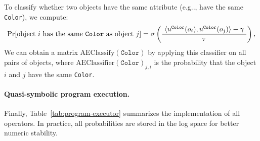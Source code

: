 \documentclass{article} \usepackage{iclr2019_conference,times}
\makeatletter
\newcommand{\sigmoid}{\sigma}
\newcommand{\tbl}[1]{Table~\ref{#1}}
\DeclareRobustCommand\onedot{\futurelet\@let@token\@onedot}
\def\@onedot{\ifx\@let@token.\else.\null\fi\xspace}
\def\eg{e.g\onedot} \def\Eg{E.g\onedot}
\makeatother
\begin{document}
To classify whether two objects have the same attribute (\eg, have the same \texttt{Color}), we compute:
\[ \Pr[\text{object $i$ has the same \texttt{Color} as object $j$}] = 
\sigmoid \left( \frac{{~\langle u^{\texttt{Color}}(o_i), u^{\texttt{Color}}(o_j) \rangle - \gamma}~}{\tau} \right),
\]
We can obtain a matrix $\mathrm{AEClassify}(\texttt{Color})$ by applying this classifier on all pairs of objects, where $\mathrm{AEClassifier}(\texttt{Color})_{j, i}$ is the probability that the object $i$ and $j$ have the same \texttt{Color}.

\paragraph{Quasi-symbolic program execution.} Finally, \tbl{tab:program-executor} summarizes the implementation of all operators. In practice, all probabilities are stored in the log space for better numeric stability.
\end{document}

